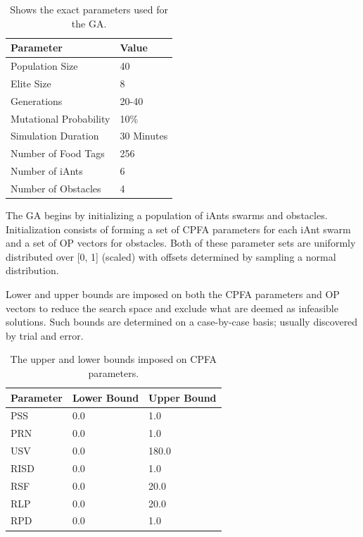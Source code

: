 \documentclass{acm_proc_article-sp}
\begin{document}
\begin{table}[h]
\begin{tabular}{@{}ll@{}}
\toprule
Parameter              & Value      \\ \midrule
Population Size        & 40         \\
Elite Size             & 8          \\
Generations            & 20-40         \\
Mutational Probability & 10\%       \\
Simulation Duration    & 30 Minutes \\
Number of Food Tags    & 256        \\ 
Number of iAnts        & 6          \\ 
Number of Obstacles    & 4          \\ \bottomrule
\end{tabular}
\caption{Shows the exact parameters used for the GA.}
\label{table:gaParams}
\end{table}

The GA begins by initializing a population of iAnts swarms and obstacles. Initialization consists of forming a set of CPFA parameters for each iAnt swarm and a set of OP vectors for obstacles. Both of these parameter sets are uniformly distributed over [0, 1] (scaled) with offsets determined by sampling a normal distribution.

Lower and upper bounds are imposed on both the CPFA parameters and OP vectors to reduce the search space and exclude what are deemed as infeasible solutions. Such bounds are determined on a case-by-case basis; usually discovered by trial and error.

\begin{table}[h]
\begin{tabular}{@{}lll@{}}
\toprule
Parameter & Lower Bound & Upper Bound \\ \midrule
PSS       & 0.0         & 1.0         \\
PRN       & 0.0         & 1.0         \\
USV       & 0.0         & 180.0       \\
RISD      & 0.0         & 1.0         \\
RSF       & 0.0         & 20.0        \\
RLP       & 0.0         & 20.0        \\
RPD       & 0.0         & 1.0         \\ \bottomrule
\end{tabular}
\caption{The upper and lower bounds imposed on CPFA parameters.} \label{table:cpfaBounds}
\end{table}
\end{document}

